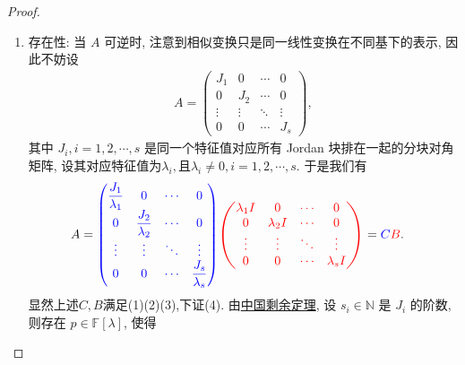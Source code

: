 \documentclass[../../main.tex]{subfiles}%
\begin{document}
\begin{proof}
\begin{enumerate}
{\heiti 唯一性:} 若还有 \( A = C_1 + B_1 \) 且满足条件 (1)(2)(3), 则 \( C_1 - C = B - B_1 \). 又 \( C_1 \) 和 \( C_1 \), \( B_1 \) 可交换, 所以 \( C_1 \) 和 \( A \) 可交换,又$C=q(A)$, 所以 \( C_1 \) 和 \( C \) 可交换. 类似的 \( B\)和\( B_1 \) 可交换. 因此对充分大的 \( n \), 利用$C,C_1$为幂零矩阵,我们有
\[
0 = \sum_{k=0}^{n} C_n^k (C_1)^k C^{n - k} = (C_1 - C)^n = (B - B_1)^n .
\]
由\hyperref[proposition:一族两两可交换的可对角化矩阵可同时相似对角化]{可交换的矩阵同时对角化}知,存在可逆阵 $Q$，使 $Q^{-1}BQ$ 和 $Q^{-1}B_1Q$ 都是对角阵。于是由上式可得
\[
(Q^{-1}BQ - Q^{-1}B_1Q)^{n} = \left(Q^{-1}(B - B_1)Q\right)^{n} = Q^{-1}(Q - B_1)^{n}Q = O,
\]
两个对角阵之差仍是一个对角阵，这个差的幂要等于零矩阵，则这两个矩阵必相等，由此即得 $B = B_1$，从而 $C = C_1$。
这就证明了唯一性.

\item {\heiti 存在性:} 当 \( A \) 可逆时, 注意到相似变换只是同一线性变换在不同基下的表示, 因此不妨设
\begin{align*}
A = \begin{pmatrix}
J_1 & 0 & \cdots & 0 \\
0 & J_2 & \cdots & 0 \\
\vdots & \vdots & \ddots & \vdots \\
0 & 0 & \cdots & J_s
\end{pmatrix},
\end{align*}
其中 \( J_i, i = 1, 2, \cdots, s \) 是同一个特征值对应所有 Jordan 块排在一起的分块对角矩阵, 设其对应特征值为$ \lambda_i,$且$\lambda_i\ne 0, i = 1, 2, \cdots, s.$
于是我们有
\begin{align*}
A &= {\color{blue} \begin{pmatrix}
\dfrac{J_1}{\lambda_1} & 0 & \cdots & 0 \\
0 & \dfrac{J_2}{\lambda_2} & \cdots & 0 \\
\vdots & \vdots & \ddots & \vdots \\
0 & 0 & \cdots & \dfrac{J_s}{\lambda_s}
\end{pmatrix}}
{\color{red} \begin{pmatrix}
\lambda_1 I & 0 & \cdots & 0 \\
0 & \lambda_2 I & \cdots & 0 \\
\vdots & \vdots & \ddots & \vdots \\
0 & 0 & \cdots & \lambda_s I
\end{pmatrix}} = {\color{blue} C}{\color{red} B}.
\end{align*}
显然上述$C,B$满足(1)(2)(3),下证(4).
由\hyperref[theorem:中国剩余定理(多项式版)]{中国剩余定理}, 设 \( s_i \in \mathbb{N} \) 是 \( J_i \) 的阶数, 则存在 \( p \in \mathbb{F}[\lambda] \), 使得

\end{enumerate}
\end{proof}
\end{document}
